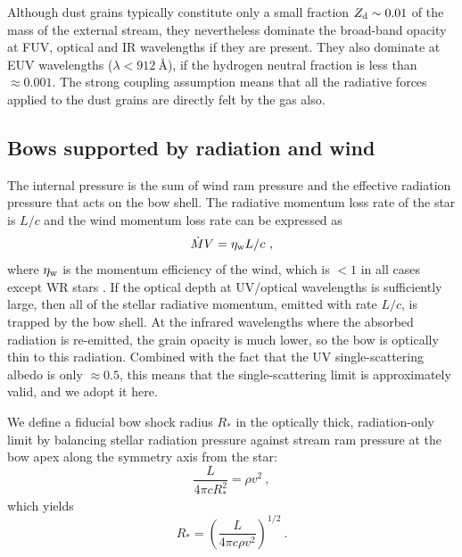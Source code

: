 Although dust grains typically constitute only a small fraction
\(Z_{\text{d}} \sim 0.01\) of the mass of the external stream, they
nevertheless dominate the broad-band opacity at FUV, optical and IR
wavelengths if they are present. They also dominate at EUV wavelengths
(\(\lambda < \SI{912}{\angstrom}\)), if the hydrogen neutral fraction is
less than \(\approx 0.001\).  The strong coupling assumption means that all
the radiative forces applied to the dust grains are directly felt by
the gas also.

\subsection{Bows supported by radiation and wind}
\label{sec:three-bow-regimes}

The internal pressure is the sum of wind ram pressure and the
effective radiation pressure that acts on the bow shell.  The
radiative momentum loss rate of the star is \(L/c\) and the wind
momentum loss rate can be expressed as
\begin{equation}
  \label{eq:wind-efficiency}
  \dot{M} V = \eta_{\text{w}} L / c \ , 
\end{equation}
where \(\eta_{\text{w}}\) is the momentum efficiency of the wind, which is
\(< 1\) in all cases except WR stars \citep{Lamers:1999b}. If the
optical depth at UV/optical wavelengths is sufficiently large, then
all of the stellar radiative momentum, emitted with rate \(L/c\), is
trapped by the bow shell.  At the infrared wavelengths where the
absorbed radiation is re-emitted, the grain opacity is much lower, so
the bow is optically thin to this radiation.  Combined with the fact
that the UV single-scattering albedo is only \(\approx 0.5\), this means
that the single-scattering limit is approximately valid, and we adopt
it here.

We define a fiducial bow shock radius \(R_*\) in the optically thick,
radiation-only limit by balancing stellar radiation pressure against
stream ram pressure at the bow apex along the
symmetry axis from the star:
\begin{equation}
  \label{eq:rad-press-balance-thick}
  \frac{L}{4 \pi c R_*^2} = \rho v^2 \ ,
\end{equation}
which yields 
\begin{equation}
  \label{eq:Rstar}
  R_* = \left(\frac{L}{4\pi c \rho v^2}\right)^{1/2} \ .
\end{equation}

